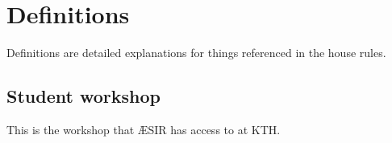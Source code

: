 
\section*{Definitions}

Definitions are detailed explanations for things referenced in the house rules.

\subsection*{Student workshop}
This is the workshop that ÆSIR has access to at KTH.